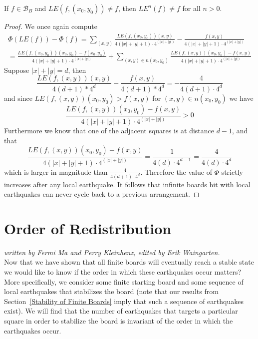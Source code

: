 \documentclass[runningheads,a4paper]{llncs}
\begin{document}
\begin{theorem} 
If $f \in \mathcal{B}_B$ and $LE(f, (x_0,y_0)) \neq f$, then $LE^{n}(f) \neq f$ for all $n>0$.
\end{theorem}
\begin{proof}
We once again compute 
\begin{align*}
\Phi(LE(f))-\Phi(f) = \sum_{(x,y)} \frac{LE(f, (x_0,y_0))(x,y)}{4(|x|+|y|+1)\cdot4^{(|x|+|y|)}} - \frac{f(x,y)}{4(|x|+|y|+1)\cdot4^{(|x|+|y|)}} \\
=\frac{LE(f, (x_0,y_0))(x_0,y_0)-f(x_0,y_0)}{4(|x|+|y|+1)\cdot4^{(|x|+|y|)}} + \sum_{(x,y) \in n(x_0,y_0)} \frac{LE(f, (x,y))(x_0,y_0)-f(x,y)}{4(|x|+|y|+1)\cdot4^{(|x|+|y|)}} 
\end{align*}
Suppose $|x|+|y|=d$, then 
\begin{equation*}
\frac{LE(f,(x,y))(x,y)}{4(d+1)*4^d} -\frac{f(x,y)}{4(d+1)*4^d} =-\frac{4}{4(d+1)\cdot 4^d}
\end{equation*}
and since $LE(f, (x,y))(x_0,y_0)>f(x,y)$ for $(x,y) \in n(x_0,y_0)$ we have
\begin{equation*}
\frac{LE(f, (x,y))(x_0,y_0)-f(x,y)}{4(|x|+|y|+1)\cdot4^{(|x|+|y|)}} >0
\end{equation*}
Furthermore we know that one of the adjacent squares is at distance $d-1$, and that 
\begin{equation*}
\frac{LE(f, (x,y))(x_0,y_0)-f(x,y)}{4(|x|+|y|+1)\cdot4^{(|x|+|y|)}}  = \frac{1}{4(d)\cdot 4^{d-1}} = \frac{4}{4(d)\cdot 4^d}
\end{equation*}which is larger in magnitude than $\frac{4}{4(d+1)\cdot 4^d}$. Therefore the value of $\Phi$ strictly increases after any local earthquake.
It follows that infinite boards hit with local earthquakes can never cycle back to a previous arrangement.
\end{proof}

\section{Order of Redistribution}
\label{Order of Redistribution}

\emph{written by Fermi Ma and Perry Kleinhenz, edited by Erik Waingarten.}\\

Now that we have shown that all finite boards will eventually reach a stable state we would like to know if the order in which these earthquakes occur matters? More specifically, we consider some finite starting board and some sequence of local earthquakes that stabilizes the board (note that our results from Section~\ref{Stability of Finite Boards} imply that such a sequence of earthquakes exist). We will find that the number of earthquakes that targets a particular square in order to stabilize the board is invariant of the order in which the earthquakes occur.\\
\end{document}
